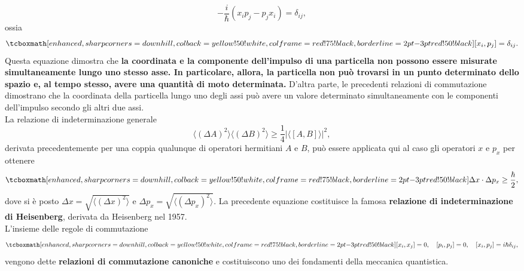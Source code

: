 	\begin{equation}
		-\frac{i}{\hbar}\left( x_ip_j-p_jx_i\right) =\delta _{ij},
	\end{equation}
ossia
	\begin{equation}
		\tcboxmath[enhanced,sharp corners=downhill ,colback=yellow!50!white,colframe=red!75!black, borderline={2pt}{-3pt}{red!50!black}]{
			\left[ x_i, p_j \right] =\delta _{ij}.
			}
	\end{equation}
Questa equazione dimostra che \textbf{la coordinata e la componente dell'impulso di una particella non possono essere misurate simultaneamente lungo uno stesso asse. In particolare, allora, la particella non può trovarsi in un punto determinato dello spazio e, al tempo stesso, avere una quantità di moto determinata.} D'altra parte, le precedenti relazioni di commutazione dimostrano che la coordinata della particella lungo uno degli assi può avere un valore determinato simultaneamente con le componenti dell'impulso secondo gli altri due assi.\\

La relazione di indeterminazione generale
	\begin{equation}
		\langle \left( \Delta A\right)^2\rangle \langle \left( \Delta B\right)^2\rangle \geq \frac{1}{4}\vert \langle \left[A,B\right] \rangle \vert ^2 ,
	\end{equation}
derivata precedentemente per una coppia qualunque di operatori hermitiani $A$ e $B$, può essere applicata qui al caso gli operatori $x$ e $p_x$ per ottenere
	\begin{equation}
		\tcboxmath[enhanced,sharp corners=downhill ,colback=yellow!50!white,colframe=red!75!black, borderline={2pt}{-3pt}{red!50!black}]{
			\Delta x \cdot \Delta p_x \geq \frac{\hbar}{2} ,
			}
	\end{equation}
dove si è posto $\Delta x = \sqrt{\langle\left(\Delta x\right) ^2\rangle}$ e $\Delta p_x = \sqrt{\langle\left(\Delta p_x\right) ^2\rangle}$. La precedente equazione costituisce la famosa \textbf{relazione di indeterminazione di Heisenberg}, derivata da Heisenberg nel 1957.\\

L'insieme delle regole di commutazione
	\begin{equation}
		\tcboxmath[enhanced,sharp corners=downhill ,colback=yellow!50!white,colframe=red!75!black, borderline={2pt}{-3pt}{red!50!black}]{
			\left[ x_i, x_j\right]=0, \quad \left[ p_i, p_j\right]=0, \quad \left[ x_i, p_j\right]=i\hbar \delta _{ij},
			} 
	\end{equation}
vengono dette \textbf{relazioni di commutazione canoniche} e costituiscono uno dei fondamenti della meccanica quantistica.\\

